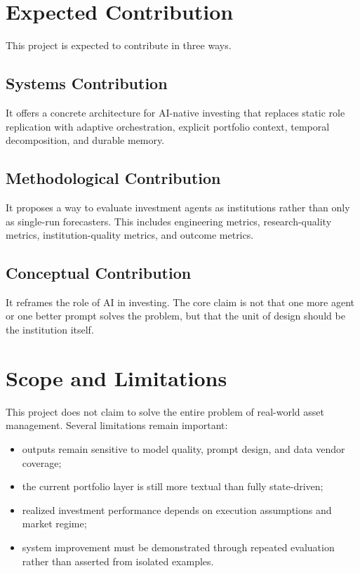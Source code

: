 \documentclass[11pt]{article}
\begin{document}
\section{Expected Contribution}

This project is expected to contribute in three ways.

\subsection{Systems Contribution}
It offers a concrete architecture for AI-native investing that replaces static role replication with adaptive orchestration, explicit portfolio context, temporal decomposition, and durable memory.

\subsection{Methodological Contribution}
It proposes a way to evaluate investment agents as institutions rather than only as single-run forecasters. This includes engineering metrics, research-quality metrics, institution-quality metrics, and outcome metrics.

\subsection{Conceptual Contribution}
It reframes the role of AI in investing. The core claim is not that one more agent or one better prompt solves the problem, but that the unit of design should be the institution itself.

\section{Scope and Limitations}

This project does not claim to solve the entire problem of real-world asset management. Several limitations remain important:

\begin{itemize}
\item outputs remain sensitive to model quality, prompt design, and data vendor coverage;
\item the current portfolio layer is still more textual than fully state-driven;
\item realized investment performance depends on execution assumptions and market regime;
\item system improvement must be demonstrated through repeated evaluation rather than asserted from isolated examples.
\end{itemize}
\end{document}
